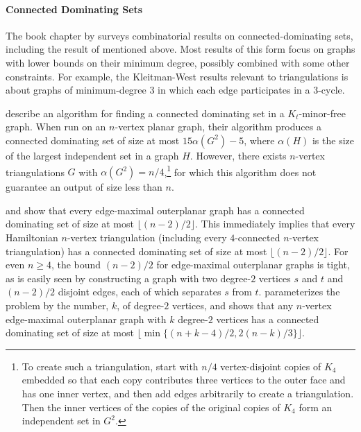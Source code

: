 \documentclass{article}
\theoremstyle{definition}
\begin{document}
\paragraph{Connected Dominating Sets}

The book chapter by \citet{chellali.favaron:connected} surveys combinatorial results on connected-dominating sets, including the result of \citet{kleitman.west:spanning} mentioned above.  Most results of this form focus on graphs with lower bounds on their minimum degree, possibly combined with some other constraints.  For example, the Kleitman-West results relevant to triangulations is about graphs of minimum-degree $3$ in which each edge participates in a $3$-cycle.

\citet{wan.alzoubi.ea:simple} describe an algorithm for finding a connected dominating set in a $K_t$-minor-free graph. When run on an $n$-vertex planar graph, their algorithm produces a connected dominating set of size at most $15\alpha(G^2)-5$, where $\alpha(H)$ is the size of the largest independent set in a graph $H$.  However, there exists $n$-vertex triangulations $G$ with $\alpha(G^2)=n/4$,\footnote{To create such a triangulation, start with $n/4$ vertex-disjoint copies of $K_4$ embedded so that each copy contributes three vertices to the outer face and has one inner vertex, and then add edges arbitrarily to create a triangulation.  Then the inner vertices of the copies of the original copies of $K_4$ form an independent set in $G^2$.} for which this algorithm does not guarantee an output of size less than $n$.

\citet{hernandez:vigilancia} and \citet{chen.hao.ea:bounds} show that every edge-maximal outerplanar graph has a connected dominating set of size at most $\lfloor (n-2)/2\rfloor$. This immediately implies that every Hamiltonian $n$-vertex triangulation (including every $4$-connected $n$-vertex triangulation) has a connected dominating set of size at most $\lfloor (n-2)/2\rfloor$.  For even $n\ge 4$, the bound $(n-2)/2$ for edge-maximal outerplanar graphs is tight, as is easily seen by constructing a graph with two degree-$2$ vertices $s$ and $t$ and $(n-2)/2$ disjoint edges, each of which separates $s$ from $t$.  \citet{zhuang:connected} parameterizes the problem by the number, $k$,  of degree-$2$ vertices, and shows that any $n$-vertex edge-maximal outerplanar graph with $k$ degree-$2$ vertices has a connected dominating set of size at most $\lfloor\min\{(n+k-4)/2,2(n-k)/3\}\rfloor$.

%
%
%
%
\end{document}
